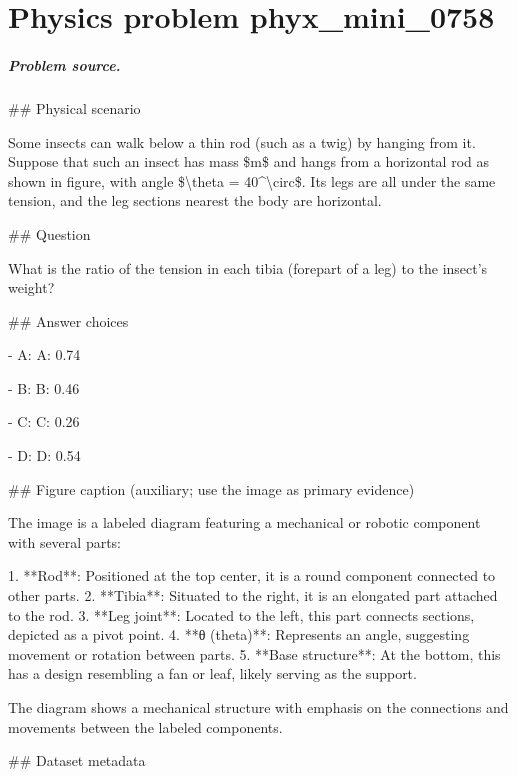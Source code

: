 
\chapter{Physics problem phyx\_mini\_0758}
\label{ch:PhyXMiniProblems_problem_phyx_mini_0758}

\paragraph{Problem source.}
\#\# Physical scenario

Some insects can walk below a thin rod (such as a twig) by hanging from it. Suppose that such an insect has mass \$m\$ and hangs from a horizontal rod as shown in figure, with angle \$\textbackslash{}theta = 40\textasciicircum{}\textbackslash{}circ\$. Its legs are all under the same tension, and the leg sections nearest the body are horizontal.

\#\# Question

What is the ratio of the tension in each tibia (forepart of a leg) to the insect's weight?

\#\# Answer choices

- A: A: 0.74

- B: B: 0.46

- C: C: 0.26

- D: D: 0.54

\#\# Figure caption (auxiliary; use the image as primary evidence)

The image is a labeled diagram featuring a mechanical or robotic component with several parts:

1. **Rod**: Positioned at the top center, it is a round component connected to other parts.
2. **Tibia**: Situated to the right, it is an elongated part attached to the rod.
3. **Leg joint**: Located to the left, this part connects sections, depicted as a pivot point.
4. **θ (theta)**: Represents an angle, suggesting movement or rotation between parts.
5. **Base structure**: At the bottom, this has a design resembling a fan or leaf, likely serving as the support.

The diagram shows a mechanical structure with emphasis on the connections and movements between the labeled components.

\#\# Dataset metadata

